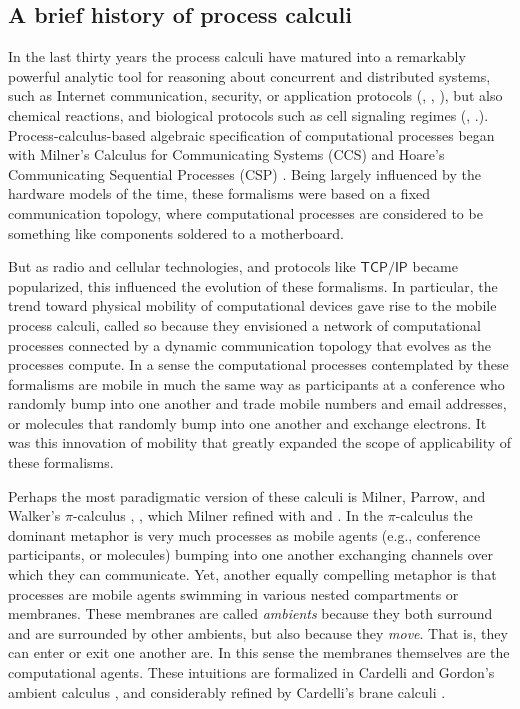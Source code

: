 \subsection{A brief history of process calculi}
In the last thirty years the process calculi have matured into
a remarkably powerful analytic tool for reasoning about concurrent and
distributed systems, such as Internet communication, security, or
application protocols (\cite{DBLP:conf/popl/AbadiB02},
\cite{DBLP:conf/epew/BrownLM05}, \cite{DBLP:conf/fossacs/LaneveZ05}),
but also chemical reactions, and biological protocols such as cell
signaling regimes (\cite{DBLP:conf/psb/RegevSS01},
\cite{DBLP:journals/ipl/PriamiRSS01}.). Process-calculus-based
algebraic specification of computational processes began with Milner's
Calculus for Communicating Systems (CCS) \cite{DBLP:books/sp/Milner80}
and Hoare's Communicating Sequential Processes (CSP)
\cite{DBLP:books/ph/Hoare85}. Being largely influenced by the hardware
models of the time, these formalisms were based on a fixed
communication topology, where computational processes are considered
to be something like components soldered to a motherboard.

But as radio and cellular technologies, and protocols like
$\mathsf{TCP/IP}$ became popularized, this influenced the evolution of
these formalisms. In particular, the trend toward physical mobility of
computational devices gave rise to the mobile process calculi, called
so because they envisioned a network of computational processes
connected by a dynamic communication topology that evolves as the
processes compute. In a sense the computational processes contemplated
by these formalisms are mobile in much the same way as participants at
a conference who randomly bump into one another and trade mobile
numbers and email addresses, or molecules that randomly bump into one
another and exchange electrons. It was this innovation of mobility
that greatly expanded the scope of applicability of these formalisms.

Perhaps the most paradigmatic version of these calculi is Milner,
Parrow, and Walker's $\pi$-calculus
\cite{DBLP:journals/iandc/MilnerPW92a},
\cite{DBLP:journals/iandc/MilnerPW92b}, which Milner refined with
\cite{DBLP:journals/mscs/Milner92} and \cite{milner91polyadicpi}. In
the $\pi$-calculus the dominant metaphor is very much processes as
mobile agents (e.g., conference participants, or molecules) bumping
into one another exchanging channels over which they can
communicate. Yet, another equally compelling metaphor is that
processes are mobile agents swimming in various nested compartments or
membranes. These membranes are called \emph{ambients} because they
both surround and are surrounded by other ambients, but also because
they \emph{move}. That is, they can enter or exit one another are. In
this sense the membranes themselves are the computational
agents. These intuitions are formalized in Cardelli and Gordon's
ambient calculus \cite{DBLP:journals/tcs/CardelliG00}, and
considerably refined by Cardelli's brane calculi
\cite{DBLP:conf/cmsb/Cardelli04}.

